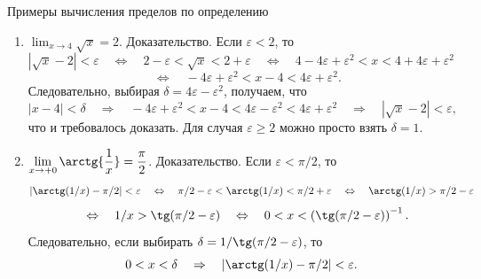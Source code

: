 \documentclass[8pt]{beamer}
\begin{document}
\begin{frame}{Примеры вычисления пределов по определению}
\begin{enumerate}
\item  $\displaystyle \lim_{x\to4}\sqrt{x} = 2$.
Доказательство. Если $\varepsilon<2$, то
$$|\sqrt{x} - 2| < \varepsilon \quad\Leftrightarrow\quad
2 - \varepsilon < \sqrt{x} < 2+ \varepsilon \quad\Leftrightarrow\quad
4-4\varepsilon+\varepsilon^2<x<4+4\varepsilon+\varepsilon^2 $$
$$\quad\Leftrightarrow\quad
-4\varepsilon+\varepsilon^2<x-4<4\varepsilon+\varepsilon^2.$$
Следовательно, выбирая $\delta = 4\varepsilon - \varepsilon^2$, получаем, что
$$|x-4|<\delta \quad\Rightarrow\quad
-4\varepsilon+\varepsilon^2 < x - 4 < 4\varepsilon-\varepsilon^2 <
 4\varepsilon +\varepsilon^2 \quad\Rightarrow\quad
|\sqrt{x} - 2| < \varepsilon,$$
что и требовалось доказать. Для случая $\varepsilon\ge 2$ можно просто взять $\delta=1$.

\item $\displaystyle \lim_{x\to+0}\arctg{\frac{1}{x}} = \frac{\pi}{2}$. Доказательство. Если $\varepsilon<\pi/2$, то
$$| \arctg(1/x) - \pi/2 |<\varepsilon \quad\Leftrightarrow\quad
\pi/2-\varepsilon<\arctg(1/x)<\pi/2+\varepsilon \quad\Leftrightarrow\quad
\arctg(1/x)>\pi/2-\varepsilon$$
$$ \quad\Leftrightarrow\quad
1/x>\tg(\pi/2 - \varepsilon)  \quad\Leftrightarrow\quad
0<x<\left( \tg(\pi/2 - \varepsilon) \right)^{-1}.$$
Следовательно, если выбирать $\delta=1/ \tg(\pi/2 - \varepsilon)$, то
$$0<x<\delta  \quad\Rightarrow\quad | \arctg(1/x) - \pi/2 |<\varepsilon.$$
\end{enumerate}
\end{frame}
\end{document}
